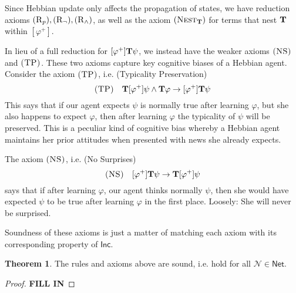 \documentclass[letterpaper]{article}
\theoremstyle{definition}
\newtheorem{theorem}{Theorem}
\newtheorem{lemma}[theorem]{Lemma}
\newcommand{\semantics}[1]{[\![\mbox{\em $ #1 $\/}]\!]}
\newcommand{\axiom}{\textsc}
\newcommand{\Typ}{\textrm{\textup{\textbf{T}}}}
\newcommand{\Inc}{\textsf{Inc}}
\newcommand{\AllNets}{\mathsf{Net}}
\newcommand{\Net}{\mathcal{N}}
\begin{document}
Since Hebbian update only affects the propagation of states, we have reduction axioms $(\axiom{R}_p), (\axiom{R}_\neg), (\axiom{R}_\land)$, as well as the axiom $(\axiom{Nest}_\Typ)$ for terms that nest $\Typ$ within $[\varphi^+]$.

In lieu of a full reduction for $[\varphi^+] \Typ \psi$, we instead have the weaker axioms $\axiom{(NS)}$ and $\axiom{(TP)}$.  These two axioms capture key cognitive biases of a Hebbian agent.  Consider the axiom $\axiom{(TP)}$, i.e. (Typicality Preservation)
\[
\axiom{(TP)} \quad \Typ [\varphi^+] \psi \land \Typ \varphi \to [\varphi^+] \Typ \psi
\]
This says that if our agent expects $\psi$ is normally true after learning $\varphi$, but she also happens to expect $\varphi$, then after learning $\varphi$ the typicality of $\psi$ will be preserved.  This is a peculiar kind of cognitive bias whereby a Hebbian agent maintains her prior attitudes when presented with news she already expects.

The axiom $\axiom{(NS)}$, i.e. (No Surprises)
\[
\axiom{(NS)} \quad [\varphi^+] \Typ \psi \to \Typ [\varphi^+] \psi
\]
says that if after learning $\varphi$, our agent thinks normally $\psi$, then she would have expected $\psi$ to be true after learning $\varphi$ in the first place.  Loosely: She will never be surprised.




Soundness of these axioms is just a matter of matching each axiom with its corresponding property of $\Inc$.

\begin{theorem}
The rules and axioms above are sound, i.e. hold for all $\Net \in \AllNets$.
\end{theorem}
\begin{proof}
\textbf{\textcolor{myred}{FILL IN}}
\end{proof}
\end{document}
